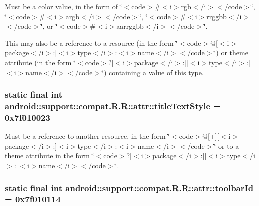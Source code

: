 Must be a \hyperlink{classandroid_1_1support_1_1compat_1_1_r_1_1color}{color} value, in the form of \char`\"{}$<$code$>$\#$<$i$>$rgb$<$/i$>$$<$/code$>$\char`\"{}, \char`\"{}$<$code$>$\#$<$i$>$argb$<$/i$>$$<$/code$>$\char`\"{}, \char`\"{}$<$code$>$\#$<$i$>$rrggbb$<$/i$>$$<$/code$>$\char`\"{}, or \char`\"{}$<$code$>$\#$<$i$>$aarrggbb$<$/i$>$$<$/code$>$\char`\"{}. 

This may also be a reference to a resource (in the form \char`\"{}$<$code$>$@\mbox{[}$<$i$>$package$<$/i$>$:\mbox{]}$<$i$>$type$<$/i$>$:$<$i$>$name$<$/i$>$$<$/code$>$\char`\"{}) or theme attribute (in the form \char`\"{}$<$code$>$?\mbox{[}$<$i$>$package$<$/i$>$:\mbox{]}\mbox{[}$<$i$>$type$<$/i$>$:\mbox{]}$<$i$>$name$<$/i$>$$<$/code$>$\char`\"{}) containing a value of this type. \hypertarget{classandroid_1_1support_1_1compat_1_1_r_1_1attr_f0ba73f7207ac85f3e7c58dbd92bd444}{
\subsubsection[{titleTextStyle}]{\setlength{\rightskip}{0pt plus 5cm}static final int android::support::compat.R.R::attr::titleTextStyle = 0x7f010023}}
\label{classandroid_1_1support_1_1compat_1_1_r_1_1attr_f0ba73f7207ac85f3e7c58dbd92bd444}


Must be a reference to another resource, in the form \char`\"{}$<$code$>$@\mbox{[}+\mbox{]}\mbox{[}$<$i$>$package$<$/i$>$:\mbox{]}$<$i$>$type$<$/i$>$:$<$i$>$name$<$/i$>$$<$/code$>$\char`\"{} or to a theme attribute in the form \char`\"{}$<$code$>$?\mbox{[}$<$i$>$package$<$/i$>$:\mbox{]}\mbox{[}$<$i$>$type$<$/i$>$:\mbox{]}$<$i$>$name$<$/i$>$$<$/code$>$\char`\"{}. \hypertarget{classandroid_1_1support_1_1compat_1_1_r_1_1attr_f911e6aee3634f0befefe1c4dc4136ff}{
\subsubsection[{toolbarId}]{\setlength{\rightskip}{0pt plus 5cm}static final int android::support::compat.R.R::attr::toolbarId = 0x7f010114}}
\label{classandroid_1_1support_1_1compat_1_1_r_1_1attr_f911e6aee3634f0befefe1c4dc4136ff}


